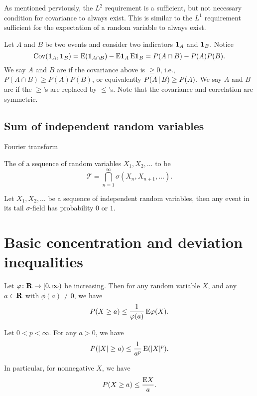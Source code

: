 As mentioned perviously, the $L^2$ requirement is a sufficient, but not necessary condition for covariance to always exist. This is similar to the $L^1$ requirement sufficient for the expectation of a random variable to always exist.

Let $A$ and $B$ be two events and consider two indicators $\mathbf{1}_A$ and $\mathbf{1}_B$. Notice \[
    \operatorname{Cov}(\mathbf{1}_A,\mathbf{1}_B) = \mathop{}\!\mathrm{E}(\mathbf{1}_{A\cap B}) - \mathop{}\!\mathrm{E}\mathbf{1}_{A} \mathop{}\!\mathrm{E}\mathbf{1}_{B} = P(A\cap B) - P(A) P(B).
\]
We say $A$ and $B$ are  if the covariance above is $\geq 0$, i.e., $P(A\cap B) \geq P(A) P(B)$, or equivalently $P(A \,|\, B) \geq P(A)$. We say $A$ and $B$ are  if the $\geq$'s are replaced by $\leq$'s. Note that the covariance and correlation are symmetric.

\subsection{Sum of independent random variables}
Fourier transform

The  of a sequence of random variables $X_1,X_2,\dotsc$ to be \[
    \mathcal{T} = \bigcap_{n=1}^\infty \sigma(X_n,X_{n+1},\dotsc).
\]

\begin{namedthm}
    Let $X_1,X_2,\dotsc$ be a sequence of independent random variables, then any event in its tail $\sigma$-field has probability $0$ or $1$.
\end{namedthm}


\section{Basic concentration and deviation inequalities}
\begin{namedthm}
    Let $\varphi\colon \mathbf{R} \to [0,\infty)$ be increasing. Then for any random variable $X$, and any $a\in \mathbf{R}$ with $\phi(a)\neq 0$, we have \[
        P(X \geq a) \leq \frac{1}{\varphi(a)}\mathop{}\!\mathrm{E} \varphi(X).
    \]
\end{namedthm}

\begin{namedthm}
    Let $0< p < \infty$. For any $a > 0$, we have \[
        P(\lvert X \rvert \geq a) \leq \frac{1}{a^p} \mathop{}\!\mathrm{E}(\lvert X \rvert^p).
    \]

    In particular, for nonnegative $X$, we have \[
        P(X \geq a) \leq \frac{\mathop{}\!\mathrm{E} X}{a}.
    \]
\end{namedthm}

